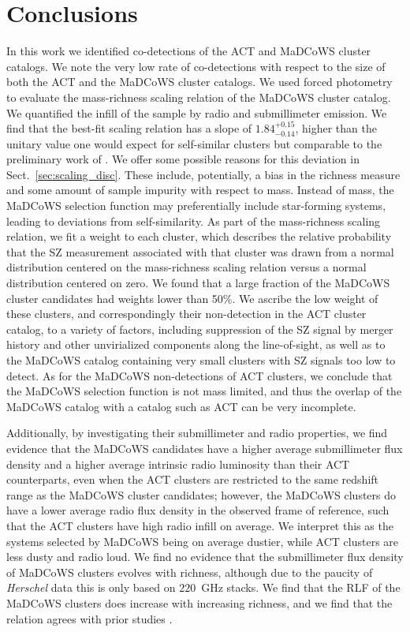 \documentclass[longauth]{aa} %
\newcommand{\madcows}{MaDCoWS\xspace}
\begin{document}

\section{Conclusions}\label{sec:conclusions}

In this work we identified co-detections of the ACT and \madcows cluster catalogs. We note the very low rate of co-detections with respect to the size of both the ACT and the \madcows cluster catalogs.  We  used forced photometry to evaluate the mass-richness scaling relation of the \madcows cluster catalog. We quantified the infill of the sample by radio and submillimeter emission. We find that the best-fit scaling relation has a slope of $1.84^{+0.15}_{-0.14}$, higher than the unitary value one would expect for self-similar clusters \citep{Andreon2010} but comparable to the preliminary work of \citet{Gonzalez2019}. We offer some possible reasons for this deviation in Sect.~\ref{sec:scaling_disc}. 
These include, potentially, a bias in the richness measure and some amount of sample impurity with respect to mass.  Instead of mass, the \madcows selection function may preferentially include star-forming systems, leading to deviations from self-similarity. As part of the mass-richness scaling relation, we fit a weight to each cluster, which describes the relative probability that the SZ measurement associated with that cluster was drawn from a normal distribution centered on the mass-richness scaling relation versus a normal distribution centered on zero. We found that a large fraction of the \madcows cluster candidates had weights lower than 50\%. We ascribe the low weight of these clusters, and correspondingly their non-detection in the ACT cluster catalog, to a variety of factors, including suppression of the SZ signal by merger history and other unvirialized components along the line-of-sight, as well as to the \madcows catalog containing very small clusters with SZ signals too low to detect. As for the \madcows non-detections of ACT clusters, we conclude that the \madcows selection function is not mass limited, and thus the overlap of the \madcows catalog with a catalog such as ACT can be very incomplete.

Additionally, by investigating their submillimeter and radio properties, we find evidence that the MaDCoWS candidates have a higher average submillimeter flux density and a higher average intrinsic radio luminosity than their ACT counterparts, even when the ACT clusters are restricted to the same redshift range as the \madcows cluster candidates; however, the \madcows clusters do have a lower average radio flux density in the observed frame of reference, such that the ACT clusters have high radio infill on average. We interpret this as the systems selected by MaDCoWS being on average dustier, while ACT clusters are less dusty and radio loud. We find no evidence that the submillimeter flux density of \madcows clusters evolves with richness, although due to the paucity of {\it Herschel} data this is only based on $220$~GHz stacks. We find that the RLF of the \madcows clusters does increase with increasing richness, and we find that the relation agrees with prior studies \citep{Mo2020}.
\end{document}
